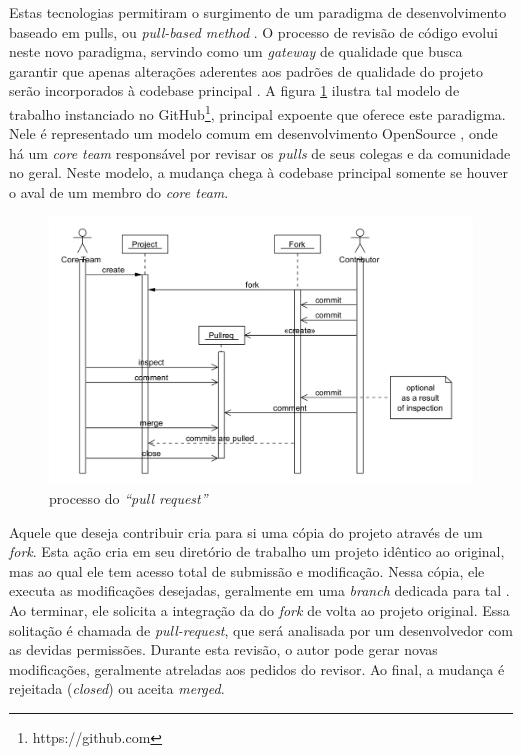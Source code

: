 \documentclass[12pt,openany,oneside,a4paper,english,brazil]{abntbibufjf}
\begin{document}
    Estas tecnologias permitiram o surgimento de um paradigma de desenvolvimento baseado em pulls, ou \textit{pull-based method} \cite{gousios2014}. O processo de revisão de código evolui neste novo paradigma, servindo como um \textit{gateway} de qualidade que busca garantir que apenas alterações aderentes aos padrões de qualidade do projeto serão incorporados à codebase principal \cite{gousios2015}. A figura \ref{fig:pull-request-flow} ilustra tal modelo de trabalho instanciado no GitHub\footnote{https://github.com}, principal expoente que oferece este paradigma. Nele é representado um modelo comum em desenvolvimento OpenSource \cite{6385140}, onde há um \textit{core team} responsável por revisar os \textit{pulls} de seus colegas e da comunidade no geral. Neste modelo, a mudança chega à codebase principal somente se houver o aval de um membro do \textit{core team}.

     \begin{figure}[!htbp]
      \includegraphics[width=\textwidth]{pull-request-flow}
      \caption{processo do \textit{``pull request''} \cite{gousios2014}}\label{fig:pull-request-flow}
    \end{figure}

    Aquele que deseja contribuir cria para si uma cópia do projeto através de um \textit{fork}. Esta ação cria em seu diretório de trabalho um projeto idêntico ao original, mas ao qual ele tem acesso total de submissão e modificação. Nessa cópia, ele executa as modificações desejadas, geralmente em uma \textit{branch} dedicada para tal \cite{gousios2016}. Ao terminar, ele solicita a integração da  do \textit{fork} de volta ao projeto original. Essa solitação é chamada de \textit{pull-request}, que será analisada por um desenvolvedor com as devidas permissões. Durante esta revisão, o autor pode gerar novas modificações, geralmente atreladas aos pedidos do revisor. Ao final, a mudança é rejeitada (\textit{closed}) ou aceita \textit{merged}.
\end{document}
